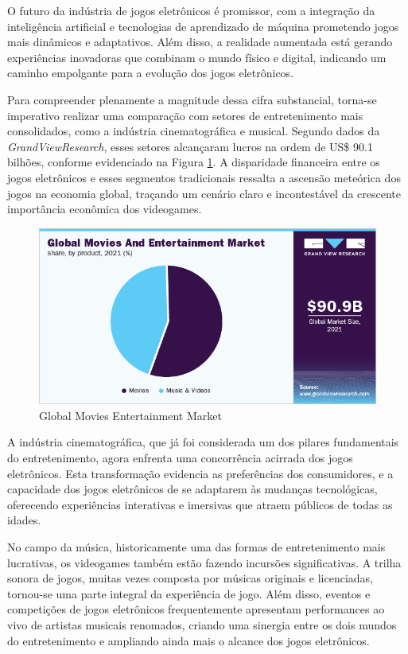 O futuro da indústria de jogos eletrônicos é promissor, com a integração da inteligência artificial e tecnologias de aprendizado de máquina prometendo jogos mais dinâmicos e adaptativos. Além disso, a realidade aumentada está gerando experiências inovadoras que combinam o mundo físico e digital, indicando um caminho empolgante para a evolução dos jogos eletrônicos.

Para compreender plenamente a magnitude dessa cifra substancial, torna-se imperativo realizar uma comparação com setores de entretenimento mais consolidados, como a indústria cinematográfica e musical. Segundo dados da \textit{\gls{GrandViewResearch}}, esses setores alcançaram lucros na ordem de US\$ 90.1 bilhões, conforme evidenciado na Figura \ref{GlobalMoviesEntertainmentMarket}. A disparidade financeira entre os jogos eletrônicos e esses segmentos tradicionais ressalta a ascensão meteórica dos jogos na economia global, traçando um cenário claro e incontestável da crescente importância econômica dos videogames.

\begin{figure}[H]
	\centering
	\includegraphics[scale=0.6]{imagens/revisaoLeitura/global_movies_entertainment_market.png}
	\caption{Global Movies Entertainment Market}
	\label{GlobalMoviesEntertainmentMarket}
\end{figure}

A indústria cinematográfica, que já foi considerada um dos pilares fundamentais do entretenimento, agora enfrenta uma concorrência acirrada dos jogos eletrônicos. Esta transformação evidencia as preferências dos consumidores, e a capacidade dos jogos eletrônicos de se adaptarem às mudanças tecnológicas, oferecendo experiências interativas e imersivas que atraem públicos de todas as idades.

No campo da música, historicamente uma das formas de entretenimento mais lucrativas, os videogames também estão fazendo incursões significativas. A trilha sonora de jogos, muitas vezes composta por músicas originais e licenciadas, tornou-se uma parte integral da experiência de jogo. Além disso, eventos e competições de jogos eletrônicos frequentemente apresentam performances ao vivo de artistas musicais renomados, criando uma sinergia entre os dois mundos do entretenimento e ampliando ainda mais o alcance dos jogos eletrônicos. 


